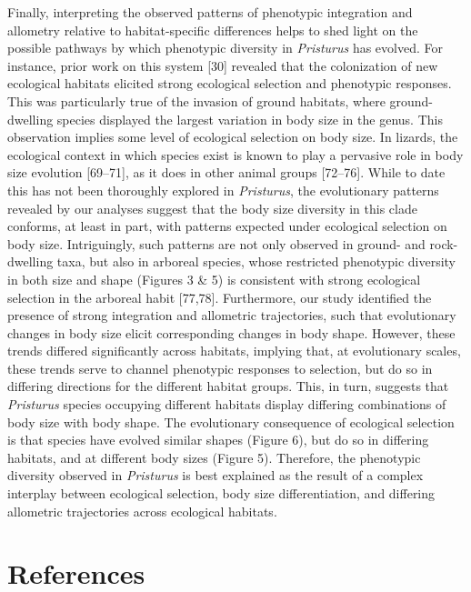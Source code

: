 \documentclass[
  11pt,
]{article}
\begin{document}
Finally, interpreting the observed patterns of phenotypic integration
and allometry relative to habitat-specific differences helps to shed
light on the possible pathways by which phenotypic diversity in
\emph{Pristurus} has evolved. For instance, prior work on this system
{[}30{]} revealed that the colonization of new ecological habitats
elicited strong ecological selection and phenotypic responses. This was
particularly true of the invasion of ground habitats, where
ground-dwelling species displayed the largest variation in body size in
the genus. This observation implies some level of ecological selection
on body size. In lizards, the ecological context in which species exist
is known to play a pervasive role in body size evolution {[}69--71{]},
as it does in other animal groups {[}72--76{]}. While to date this has
not been thoroughly explored in \emph{Pristurus}, the evolutionary
patterns revealed by our analyses suggest that the body size diversity
in this clade conforms, at least in part, with patterns expected under
ecological selection on body size. Intriguingly, such patterns are not
only observed in ground- and rock-dwelling taxa, but also in arboreal
species, whose restricted phenotypic diversity in both size and shape
(Figures 3 \& 5) is consistent with strong ecological selection in the
arboreal habit {[}77,78{]}. Furthermore, our study identified the
presence of strong integration and allometric trajectories, such that
evolutionary changes in body size elicit corresponding changes in body
shape. However, these trends differed significantly across habitats,
implying that, at evolutionary scales, these trends serve to channel
phenotypic responses to selection, but do so in differing directions for
the different habitat groups. This, in turn, suggests that
\emph{Pristurus} species occupying different habitats display differing
combinations of body size with body shape. The evolutionary consequence
of ecological selection is that species have evolved similar shapes
(Figure 6), but do so in differing habitats, and at different body sizes
(Figure 5). Therefore, the phenotypic diversity observed in
\emph{Pristurus} is best explained as the result of a complex interplay
between ecological selection, body size differentiation, and differing
allometric trajectories across ecological habitats.

\newpage

\hypertarget{references}{%
\section*{References}\label{references}}
\end{document}
